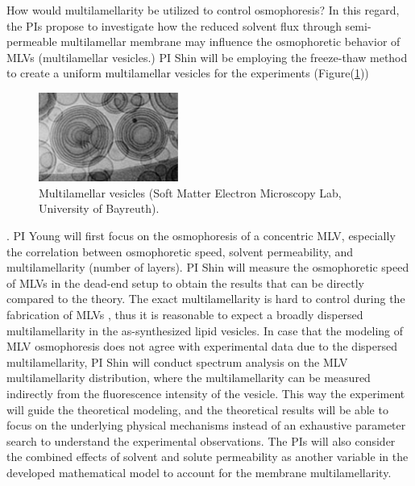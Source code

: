 \documentclass[11pt]{article}
\begin{document}
How would multilamellarity be utilized to control osmophoresis? 
In this regard, the PIs propose to investigate how the reduced solvent flux through semi-permeable multilamellar membrane
may influence the osmophoretic behavior of MLVs (multilamellar vesicles.) PI Shin will be employing the freeze-thaw method to 
create a uniform multilamellar vesicles for the experiments (Figure(\ref{fig:Multilamellar})) 
\begin{figure}
\centerline{\includegraphics[width=1.8in]{figs/Multilamellar.pdf}}
\caption{\footnotesize Multilamellar vesicles (Soft Matter Electron Microscopy Lab, University of Bayreuth).}
\label{fig:Multilamellar}
\end{figure}
%
\cite{szoka1980}. 
PI Young will first focus on the osmophoresis of a concentric MLV, especially the correlation between osmophoretic speed, 
solvent permeability, and multilamellarity (number of layers).
PI Shin will measure the osmophoretic speed of MLVs in the dead-end setup to obtain the results that can be directly compared to the theory.
The exact multilamellarity is hard to control during the fabrication of MLVs \cite{Lasic1988_BiochemJ}, thus it is reasonable to
expect a broadly dispersed multilamellarity in the as-synthesized lipid vesicles. In case that the modeling of MLV osmophoresis does not
agree with experimental data due to the dispersed multilamellarity, PI Shin will conduct spectrum analysis on the MLV multilamellarity distribution, where the multilamellarity can be measured indirectly from the fluorescence intensity of the vesicle.
This way the experiment will guide the theoretical modeling, and the theoretical results will be able to focus on the underlying physical mechanisms instead of
an exhaustive parameter search to understand the experimental observations.
The PIs will also consider the combined effects of  solvent and solute permeability as another variable in the developed 
mathematical model to account for the membrane multilamellarity. 
\end{document}
